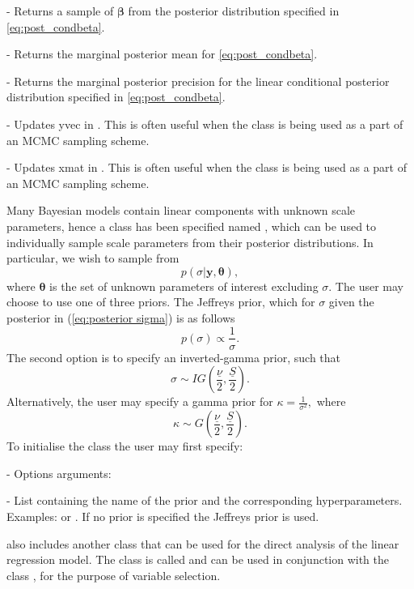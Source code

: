 \documentclass[article]{jss}
\begin{document}
\begin{description}

\item {} - Returns a sample of $\bm{\beta}$ from the
  posterior distribution specified in \ref{eq:post_condbeta}.
\item {} - Returns the marginal
  posterior mean for \ref{eq:post_condbeta}.
\item {} - Returns the
  marginal posterior precision for the linear conditional posterior
  distribution specified in \ref{eq:post_condbeta}.
\item {} - Updates yvec in
  . This is often useful when the class is
  being used as a part of an MCMC sampling scheme.
\item {} - Updates xmat in
  . This is often useful when the class is
  being used as a part of an MCMC sampling scheme.
\end{description}
Many Bayesian models contain linear components with unknown scale
parameters, hence a class has been specified named
, which can be used to individually sample
scale parameters from their posterior distributions. In particular, we
wish to sample from
\begin{equation} p(\sigma|\bm{y},\bm{\theta}),\label{eq:posterior
    sigma}
\end{equation} where $\bm{\theta}$ is the set of unknown
parameters of interest excluding $\sigma.$ The user may choose to use
one of three priors.  The Jeffreys prior, which for $\sigma$ given
the posterior in (\ref{eq:posterior sigma}) is as follows \[
p(\sigma)\propto\frac{1}{\sigma}.\] The second option is to specify an
inverted-gamma prior, such that\[ \sigma\sim
IG\left(\frac{\underline{\nu}}{2},\frac{\underline{S}}{2}\right).\]
Alternatively, the user may specify a gamma prior for
$\kappa=\frac{1}{\sigma^{2}},$ where\[ \kappa\sim
G\left(\frac{\underline{\nu}}{2},\frac{\underline{S}}{2}\right).\] To
initialise the class  the user may first
specify:
\begin{description}
\item {} - Options arguments:
\begin{description}
\item {} - List containing the name of the prior and the
  corresponding hyperparameters. Examples:
   or
  . If no prior is
  specified the Jeffreys prior is used.
\end{description}
\end{description}
 also includes another class that can be used for the
direct analysis of the linear regression model. The class is called
 and can be used in conjunction with the class
, for the purpose of variable selection.
\end{document}
